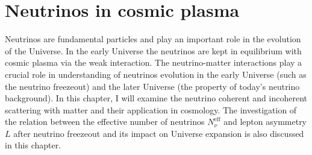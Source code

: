 \section{Neutrinos in cosmic plasma }\label{Neutrino}
Neutrinos are fundamental particles and play an important role in the evolution of the Universe. In the early Universe the neutrinos are kept in equilibrium with cosmic plasma via the weak interaction. The neutrino-matter interactions play a crucial role in  understanding of neutrinos evolution in the early Universe (such as the neutrino freezeout) and the later Universe (the property of today's neutrino background). In this chapter, I will examine the neutrino coherent and incoherent scattering with matter and their application in cosmology. The investigation of the relation between the effective number of neutrinos $N^{\mathrm{eff}}_\nu$ and lepton asymmetry $L$ after neutrino freezeout and its impact on Universe expansion is also discussed in this chapter. 



